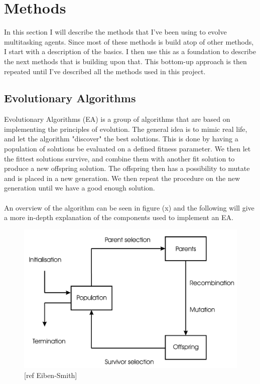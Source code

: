 %
\section{Methods}
In this section I will describe the methods that I've been using to evolve multitasking agents. Since most of these methods is build atop of other methods, I start with a description of the basics. I then use this as a foundation to describe the next methods that is building upon that. This bottom-up approach is then repeated until I've described all the methods used in this project.
\subsection{Evolutionary Algorithms}
Evolutionary Algorithms (EA) is a group of algorithms that are based on implementing the principles of evolution. The general idea is to mimic real life, and let the algorithm "discover" the best solutions. This is done by having a population of solutions be evaluated on a defined fitness parameter. We then let the fittest solutions survive, and combine them with another fit solution to produce a new offspring solution. The offspring then has a possibility to mutate and is placed in a new generation. We then repeat the procedure on the new generation until we have a good enough solution.
\\
\\
An overview of the algorithm can be seen in figure (x) and the following will give a more in-depth explanation of the components used to implement an EA.
\begin{figure}[!ht]
\centering
\includegraphics[scale=0.2]{EA_Figure}
\caption{[ref Eiben-Smith]}
\end{figure}
